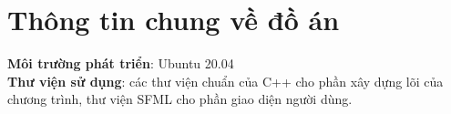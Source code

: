 \section{Thông tin chung về đồ án}
\textbf{Môi trường phát triển}: Ubuntu 20.04\\
\textbf{Thư viện sử dụng}: các thư viện chuẩn của C++ cho phần xây dựng lõi của chương trình, thư viện SFML cho phần giao diện người dùng.